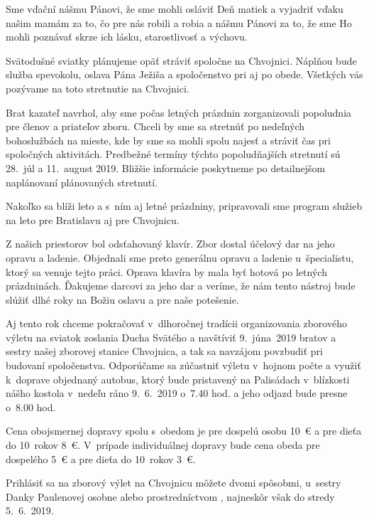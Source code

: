 Sme vďační nášmu Pánovi, že sme mohli osláviť Deň matiek a vyjadriť vďaku našim mamám za to, čo pre nás robili a robia a nášmu Pánovi za to, že sme Ho mohli poznávať skrze ich lásku, starostlivosť a výchovu.

Svätodušné sviatky plánujeme opäť stráviť spoločne na Chvojnici. Náplňou bude služba spevokolu, oslava Pána Ježiša a spoločenstvo pri aj po obede. Všetkých vás pozývame na toto stretnutie na Chvojnici.

Brat kazateľ navrhol, aby sme počas letných prázdnin zorganizovali popoludnia pre členov a priateľov zboru. Chceli by sme sa stretnúť po nedeľných bohoslužbách na mieste, kde by sme sa mohli spolu najesť a stráviť čas pri spoločných aktivitách. Predbežné termíny týchto popoludňajších stretnutí sú 28.~júl a 11.~august 2019. Bližšie informácie poskytneme po detailnejšom naplánovaní plánovaných stretnutí.

Nakoľko sa blíži leto a s~ním aj letné prázdniny, pripravovali sme program služieb na leto pre Bratislavu aj pre Chvojnicu.

Z našich priestorov bol odsťahovaný klavír. Zbor dostal účelový dar na jeho opravu a ladenie. Objednali sme preto generálnu opravu a ladenie u~špecialistu, ktorý sa venuje tejto práci. Oprava klavíra by mala byť hotová po letných prázdninách. Ďakujeme darcovi za jeho dar a veríme, že nám tento nástroj bude slúžiť dlhé roky na Božiu oslavu a pre naše potešenie.

\vfill\break


Aj tento rok chceme pokračovať v~dlhoročnej tradícii organizovania zborového výletu na sviatok zoslania Ducha Svätého a navštíviť 9.~júna~2019 bratov a sestry našej zborovej stanice Chvojnica, a tak sa navzájom povzbudiť pri budovaní spoločenstva.
Odporúčame sa zúčastniť výletu v~hojnom počte a využiť k~doprave objednaný autobus, ktorý bude pristavený na Palisádach v~blízkosti nášho kostola v~nedeľu ráno 9.~6.~2019 o~7.40 hod. a jeho odjazd bude presne o~8.00 hod.

Cena obojsmernej dopravy spolu s~obedom je pre dospelú osobu 10~€ a pre dieťa do 10~rokov 8~€. V~prípade individuálnej dopravy bude cena obeda pre dospelého 5~€ a pre dieťa do 10~rokov 3~€.

Prihlásiť sa na zborový výlet na Chvojnicu môžete dvomi spôsobmi, u~sestry Danky Paulenovej osobne alebo prostredníctvom , najneskôr však do stredy 5.~6.~2019.


